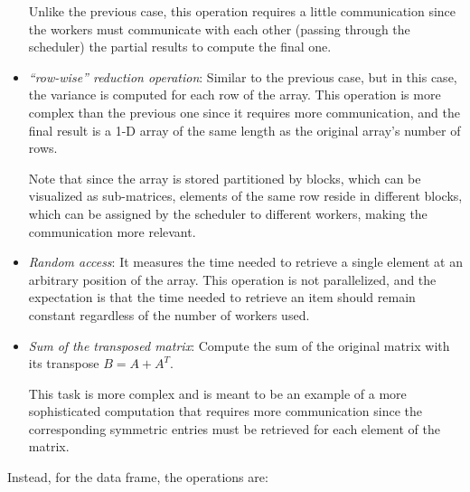 \begin{itemize}
    Unlike the previous case, this operation requires a little communication
    since the workers must communicate with each other (passing through the
    scheduler) the partial results to compute the final one.
 \item \textit{``row-wise'' reduction operation}: Similar to the previous case,
   but in this case, the variance is computed for each row of the array.
    This operation is more complex than the previous one since it requires more
    communication, and the final result is a 1-D array of the same length as the
    original array's number of rows.

    Note that since the array is stored partitioned by blocks, which can be
    visualized as sub-matrices, elements of the same row reside in different
    blocks, which can be assigned by the scheduler to different workers, making
    the communication more relevant.
  \item \textit{Random access}: It measures the time needed to retrieve a single
    element at an arbitrary position of the array.
    This operation is not parallelized, and the expectation is that the time
    needed to retrieve an item should remain constant regardless of the number
    of workers used.
  \item \textit{Sum of the transposed matrix}: Compute the sum of the original
    matrix with its transpose $B = A+A^T$.

    This task is more complex and is meant to be an example of a more
    sophisticated computation that requires more communication since the
    corresponding symmetric entries must be retrieved for each element of the
    matrix.
\end{itemize}

Instead, for the data frame, the operations are:

